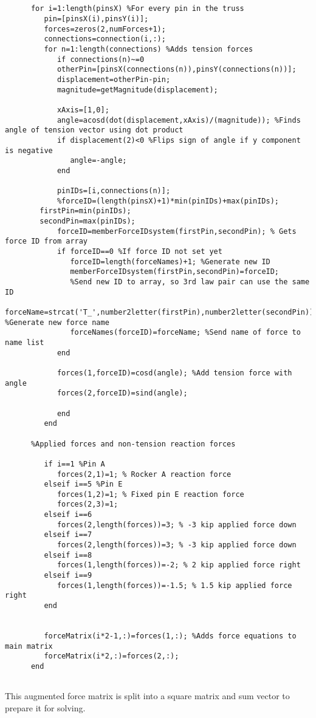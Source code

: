 \documentclass[9pt,letterpaper]{article}
\begin{document}
	  \begin{verbatim}
	  
	  
	  for i=1:length(pinsX) %For every pin in the truss
	     pin=[pinsX(i),pinsY(i)];
	     forces=zeros(2,numForces+1);
	     connections=connection(i,:);
	     for n=1:length(connections) %Adds tension forces
	        if connections(n)~=0
	        otherPin=[pinsX(connections(n)),pinsY(connections(n))];
	        displacement=otherPin-pin;
	        magnitude=getMagnitude(displacement);
	  
	        xAxis=[1,0]; 
	        angle=acosd(dot(displacement,xAxis)/(magnitude)); %Finds angle of tension vector using dot product
	        if displacement(2)<0 %Flips sign of angle if y component is negative
	           angle=-angle;
	        end
	  
	        pinIDs=[i,connections(n)];
	        %forceID=(length(pinsX)+1)*min(pinIDs)+max(pinIDs);
   	    firstPin=min(pinIDs);
        secondPin=max(pinIDs);
	        forceID=memberForceIDsystem(firstPin,secondPin); % Gets force ID from array
	        if forceID==0 %If force ID not set yet
	           forceID=length(forceNames)+1; %Generate new ID
	           memberForceIDsystem(firstPin,secondPin)=forceID; 
	           %Send new ID to array, so 3rd law pair can use the same ID
	           forceName=strcat('T_',number2letter(firstPin),number2letter(secondPin)); %Generate new force name
	           forceNames(forceID)=forceName; %Send name of force to name list
	        end
	  
	        forces(1,forceID)=cosd(angle); %Add tension force with angle
	        forces(2,forceID)=sind(angle);
	  
	        end
	     end
	     
	  %Applied forces and non-tension reaction forces
	  
	     if i==1 %Pin A
	        forces(2,1)=1; % Rocker A reaction force
	     elseif i==5 %Pin E
	        forces(1,2)=1; % Fixed pin E reaction force
	        forces(2,3)=1;
	     elseif i==6 
	        forces(2,length(forces))=3; % -3 kip applied force down
	     elseif i==7
	        forces(2,length(forces))=3; % -3 kip applied force down
	     elseif i==8
	        forces(1,length(forces))=-2; % 2 kip applied force right
	     elseif i==9
	        forces(1,length(forces))=-1.5; % 1.5 kip applied force right
	     end
	  
	  
	     forceMatrix(i*2-1,:)=forces(1,:); %Adds force equations to main matrix
	     forceMatrix(i*2,:)=forces(2,:);
	  end
	  
	  \end{verbatim}
	 This augmented force matrix is split into a square matrix and sum vector to prepare it for solving.
	 
\end{document}
